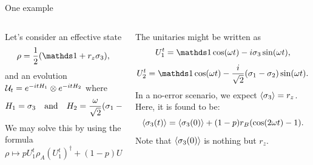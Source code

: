 \begin{frame}{One example}
    \begin{columns}
        \begin{column}{0.5\textwidth}
            Let's consider an effective state
                \begin{equation*}
                    \rho=\frac{1}{2}(\Id+r_{z}\pauli{3}),
                \end{equation*}
            and an evolution $\mathcal{U}_{t}=e^{-itH_{1}}\otimes e^{-itH_{2}}$ where
                \begin{align*}
                    H_{1}=\sigma_{3} & & \text{and} & & H_{2}=\frac{\omega}{\sqrt{2}}(\sigma_{1}-\sigma_{2}).
                \end{align*}
            We may solve this by using the formula
                \begin{equation*}
                    \rho\mapsto pU_{1}^{t}\rho_{A}(U_{1}^{t})^{\dag}+(1-p)U_{2}^{t}\rho_{B} (U_{2}^{t})^{\dag}.
                \end{equation*}
        \end{column}
        \begin{column}{0.5\textwidth}
            The unitaries might be written as
                \begin{equation*}
                    U_{1}^{t}=\Id\cos(\omega t) - i \pauli{3} \sin(\omega t),
                \end{equation*}
                \begin{equation*}
                    U_{2}^{t}=\Id\cos(\omega t) - \frac{i}{\sqrt{2}} (\pauli{1}-\pauli{2}) \sin(\omega t).
                \end{equation*}
                In a no-error scenario, we expect $\expval{\sigma_{3}}=r_{z}$. Here, it is found to be:
                \begin{equation*}
                    \expval{\sigma_{3}(t)}=\expval{\sigma_{3}(0)}+(1-p)r_{B}(\cos(2\omega t)-1).
                \end{equation*}
            Note that $\expval{\sigma_{3}(0)}$ is nothing but $r_{z}$.
        \end{column}
    \end{columns}
\end{frame}

